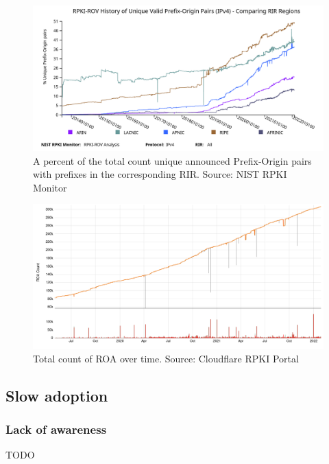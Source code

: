 \begin{figure}[ht]
	\begin{center}
   \includegraphics[width = 1\linewidth]{./img/RPKIROV_20220130.png}
	\end{center}
	\caption{A percent of the total count unique announced Prefix-Origin pairs with prefixes in the corresponding RIR. Source: NIST RPKI Monitor \label{fig:rpki-rov}}
\end{figure}
\begin{figure}[ht]
	\begin{center}
   \includegraphics[width = 1\linewidth]{./img/ROA-history.png}
	\end{center}
	\caption{Total count of ROA over time. Source: Cloudflare RPKI Portal\label{fig:rpki-roa}}
\end{figure}
\subsection{Slow adoption}
\label{now:slow}



\subsubsection{Lack of awareness}
TODO

